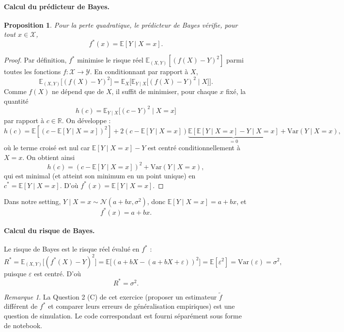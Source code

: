 \documentclass[11pt]{article}
\newtheorem{proposition}{Proposition}
\theoremstyle{remark}
\newtheorem*{remark}{Remarque}
\newcommand{\X}{\mathcal{X}}
\newcommand{\Y}{\mathcal{Y}}
\newcommand{\E}{\mathbb{E}}
\newcommand{\R}{\mathbb{R}}
\newcommand{\Var}{\mathrm{Var}}
\begin{document}
	\paragraph{Calcul du prédicteur de Bayes.}
	
	\begin{proposition}
		Pour la perte quadratique, le prédicteur de Bayes vérifie, pour tout $x \in \X$,
		\[
		f^*(x) = \E[Y \mid X = x].
		\]
	\end{proposition}
	
	\begin{proof}
		Par définition, $f^*$ minimise le risque réel $\E_{(X,Y)}[(f(X)-Y)^2]$ parmi toutes les fonctions $f : \X \to \Y$. En conditionnant par rapport à $X$,
		\[
		\E_{(X,Y)}\big[(f(X)-Y)^2\big] = \E_X\Big[\E_{Y\mid X}\big[(f(X)-Y)^2 \mid X\big]\Big].
		\]
		Comme $f(X)$ ne dépend que de $X$, il suffit de minimiser, pour chaque $x$ fixé, la quantité
		\[
		h(c) = \E_{Y\mid X}\big[(c-Y)^2 \mid X=x\big]
		\]
		par rapport à $c \in \R$. On développe :
		\[
		h(c) = \E[(c - \E[Y\mid X=x])^2] + 2(c - \E[Y\mid X=x])\underbrace{\E[\E[Y\mid X=x] - Y \mid X=x]}_{=0} + \Var(Y\mid X=x),
		\]
		où le terme croisé est nul car $\E[Y \mid X=x] - Y$ est centré conditionnellement à $X=x$. On obtient ainsi
		\[
		h(c) = (c - \E[Y\mid X=x])^2 + \Var(Y \mid X=x),
		\]
		qui est minimal (et atteint son minimum en un point unique) en $c^* = \E[Y \mid X=x]$. D'où $f^*(x) = \E[Y\mid X=x]$.
	\end{proof}
	
	Dans notre setting, $Y \mid X=x \sim \mathcal{N}(a+bx, \sigma^2)$, donc $\E[Y\mid X=x] = a+bx$, et
	\[
	\boxed{f^*(x) = a + bx}.
	\]
	
	\paragraph{Calcul du risque de Bayes.}
	Le risque de Bayes est le risque réel évalué en $f^*$ :
	\[
	R^* = \E_{(X,Y)}\big[(f^*(X)-Y)^2\big] = \E\big[(a+bX - (a+bX+\varepsilon))^2\big] = \E[\varepsilon^2] = \Var(\varepsilon) = \sigma^2,
	\]
	puisque $\varepsilon$ est centré. D'où
	\[
	\boxed{R^* = \sigma^2}.
	\]
	
	\bigskip
	\begin{remark}
		La Question 2 (C) de cet exercice (proposer un estimateur $\tilde f$ différent de $f^*$ et comparer leurs erreurs de généralisation empiriques) est une question de simulation. Le code correspondant est fourni séparément sous forme de notebook.
	\end{remark}
	
\end{document}
